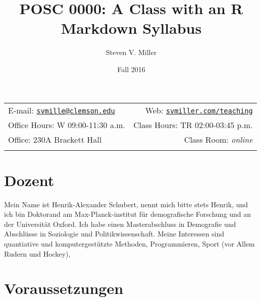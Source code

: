 \setcounter{secnumdepth}{0}





\usepackage{setspace}

\title{POSC 0000: A Class with an R Markdown Syllabus}
\author{Steven V. Miller}
\date{Fall 2016}


  

		\maketitle
		
	
		\thispagestyle{firststyle}



	\noindent \begin{tabular*}{\textwidth}{ @{\extracolsep{\fill}} lr @{\extracolsep{\fill}}}


E-mail: \texttt{\href{mailto:svmille@clemson.edu}{\nolinkurl{svmille@clemson.edu}}} & Web: \href{http://svmiller.com/teaching}{\tt svmiller.com/teaching}\\
Office Hours: W 09:00-11:30 a.m.  &  Class Hours: TR 02:00-03:45 p.m.\\
Office: 230A Brackett Hall  & Class Room: \emph{online}\\
	&  \\
	\hline
	\end{tabular*}
	
\vspace{2mm}
	


\section{Dozent}\label{dozent}

Mein Name ist Henrik-Alexander Schubert, nennt mich bitte stets Henrik,
und ich bin Doktorand am Max-Planck-institut für demografische Forschung
und an der Universität Oxford. Ich habe einen Masterabschluss in
Demografie und Abschlüsse in Soziologie und Politikwissenschaft. Meine
Interessen sind quantiative und komputergestützte Methoden,
Programmieren, Sport (vor Allem Rudern und Hockey),

\section{Voraussetzungen}\label{voraussetzungen}

